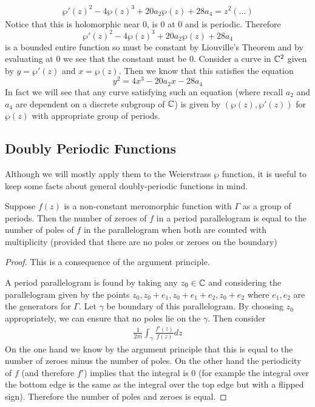 \begin{align*}
    \wp'(z)^2 - 4\wp(z)^3 + 20a_2 \wp(z) + 28a_4 = z^2(\dots)
\end{align*}
Notice that this is holomorphic near 0, is 0 at 0 and is periodic. Therefore 
$$\wp'(z)^2 - 4\wp(z)^3 + 20a_2 \wp(z) + 28a_4$$
is a bounded entire function so must be constant by Liouville's Theorem and by evaluating at 0 we see that the constant must be 0. Consider a curve in $\mathbb{C}^2$ given by $y = \wp'(z)$ and $x = \wp(z)$. Then we know that this satisfies the equation
$$ y^2 = 4x^3 - 20a_2 x - 28a_4 $$
In fact we will see that any curve satisfying such an equation (where recall $a_2$ and $a_4$ are dependent on a discrete subgroup of $\mathbb{C}$) is given by $(\wp(z), \wp'(z))$ for $\wp(z)$ with appropriate group of periods. 

\subsection{Doubly Periodic Functions}
Although we will mostly apply them to the Weierstrass $\wp$ function, it is useful to keep some facts about general doubly-periodic functions in mind.
\begin{proposition}\label{prop:num-zeros-poles-period-parallel}
    Suppose $f(z)$ is a non-constant meromorphic function with $\Gamma$ as a group of periods. Then the number of zeroes of $f$ in a period parallelogram is equal to the number of poles of $f$ in the parallelogram when both are counted with multiplicity (provided that there are no poles or zeroes on the boundary)
\end{proposition}
\begin{proof}
    This is a consequence of the argument principle. 

    A period parallelogram is found by taking any $z_0 \in \mathbb{C}$ and considering the parallelogram given by the points $z_0, z_0 + e_1, z_0 + e_1 + e_2, z_0 + e_2$ where $e_1, e_2$ are the generators for $\Gamma$. Let $\gamma$ be boundary of this parallelogram. By choosing $z_0$ appropriately, we can ensure that no poles lie on the $\gamma$. Then consider
    \begin{align*}
        \frac{1}{2\pi i} \int_\gamma \frac{f'(z)}{f(z)}dz
    \end{align*}
    On the one hand we know by the argument principle that this is equal to the number of zeroes minus the number of poles. On the other hand the periodicity of $f$ (and therefore $f'$) implies that the integral is 0 (for example the integral over the bottom edge is the same as the integral over the top edge but with a flipped sign). Therefore the number of poles and zeroes is equal.
\end{proof}
